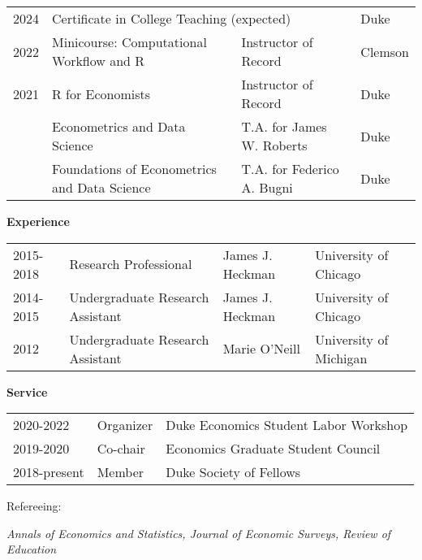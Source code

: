 \documentclass[12pt]{article}
\begin{document}
\vspace{1em}

\begin{tabular}{@{}lp{}p{}p{}}
2024 & \multicolumn{2}{l}{Certificate in College Teaching (expected)} & Duke \\
2022 & Minicourse: Computational Workflow and R & Instructor of Record & Clemson  \\
2021 & R for Economists & Instructor of Record & Duke  \\
& Econometrics and Data Science & T.A. for James W. Roberts & Duke \\
& Foundations of Econometrics and Data Science & T.A. for Federico A. Bugni & Duke 
\end{tabular}

\vspace{1em}


\textbf{Experience} 

\vspace{1em}

\begin{tabular}{@{}llll}
2015-2018 & Research Professional & James J. Heckman & University of Chicago \\
2014-2015 & Undergraduate Research Assistant & James J. Heckman & University of Chicago \\
2012 & Undergraduate Research Assistant & Marie O'Neill & University of Michigan
\end{tabular}

\vspace{1em}

\textbf{Service} 

\vspace{1em}

\begin{tabular}{@{}lll}
2020-2022 & Organizer & Duke Economics Student Labor Workshop \\
2019-2020 & Co-chair & Economics Graduate Student Council \\
2018-present & Member & Duke Society of Fellows \\
\end{tabular}

\vspace{1em}
Refereeing:

\vspace{1em}

\textit{Annals of Economics and Statistics, Journal of Economic Surveys, Review of Education}
\end{document}
